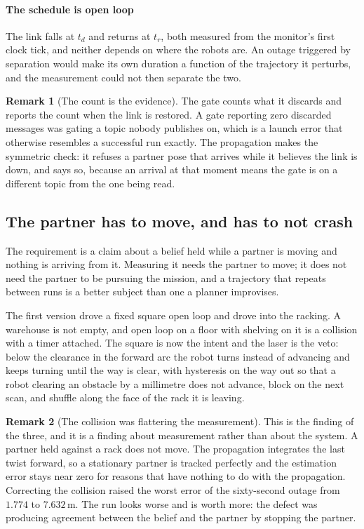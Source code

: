 \documentclass[11pt,a4paper]{article}
\theoremstyle{definition}
\newtheorem{remark}{Remark}
\begin{document}
\paragraph{The schedule is open loop} The link falls at $t_{d}$ and returns at
$t_{r}$, both measured from the monitor's first clock tick, and neither depends
on where the robots are. An outage triggered by separation would make its own
duration a function of the trajectory it perturbs, and the measurement could
not then separate the two.

\begin{remark}[The count is the evidence]
\label{rem:count}
The gate counts what it discards and reports the count when the link is
restored. A gate reporting zero discarded messages was gating a topic nobody
publishes on, which is a launch error that otherwise resembles a successful run
exactly. The propagation makes the symmetric check: it refuses a partner pose
that arrives while it believes the link is down, and says so, because an
arrival at that moment means the gate is on a different topic from the one
being read.
\end{remark}

\subsection{The partner has to move, and has to not crash}
\label{sec:patrol}

The requirement is a claim about a belief held while a partner is moving and
nothing is arriving from it. Measuring it needs the partner to move; it does
not need the partner to be pursuing the mission, and a trajectory that repeats
between runs is a better subject than one a planner improvises.

The first version drove a fixed square open loop and drove into the racking. A
warehouse is not empty, and open loop on a floor with shelving on it is a
collision with a timer attached. The square is now the intent and the laser is
the veto: below the clearance in the forward arc the robot turns instead of
advancing and keeps turning until the way is clear, with hysteresis on the way
out so that a robot clearing an obstacle by a millimetre does not advance, block
on the next scan, and shuffle along the face of the rack it is leaving.

\begin{remark}[The collision was flattering the measurement]
\label{rem:flattering}
This is the finding of the three, and it is a finding about measurement rather
than about the system. A partner held against a rack does not move. The
propagation integrates the last twist forward, so a stationary partner is
tracked perfectly and the estimation error stays near zero for reasons that
have nothing to do with the propagation. Correcting the collision raised the
worst error of the sixty-second outage from $1.774$ to $7.632$\,m. The run
looks worse and is worth more: the defect was producing agreement between the
belief and the partner by stopping the partner.
\end{remark}
\end{document}
